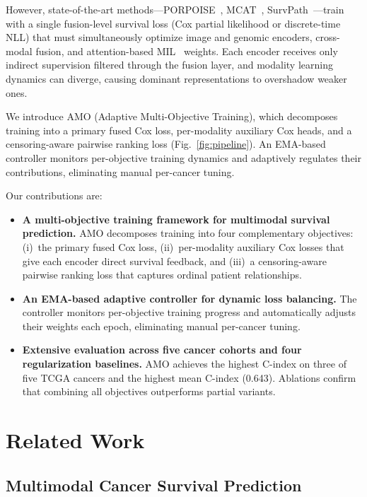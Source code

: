 \documentclass[10pt,twocolumn,letterpaper]{article}
\begin{document}
However, state-of-the-art methods---PORPOISE~\cite{chen2022porpoise},
MCAT~\cite{chen2021}, SurvPath~\cite{jaume2024survpath}---train with
a single fusion-level survival loss (Cox partial likelihood or
discrete-time NLL) that must simultaneously optimize image and
genomic encoders, cross-modal fusion, and attention-based
MIL~\cite{lu2021abmil} weights. Each encoder receives only indirect
supervision filtered through the fusion layer, and modality learning
dynamics can diverge, causing dominant representations to overshadow
weaker ones.

We introduce AMO (Adaptive Multi-Objective Training), which
decomposes training into a primary fused Cox loss, per-modality
auxiliary Cox heads, and a censoring-aware pairwise ranking loss
(Fig.~\ref{fig:pipeline}). An EMA-based controller monitors
per-objective training dynamics and adaptively regulates their
contributions, eliminating manual per-cancer tuning.

Our contributions are:
\begin{itemize}
\item \textbf{A multi-objective training framework for
multimodal survival prediction.} AMO decomposes training into four
complementary objectives: (i)~the primary fused Cox loss,
(ii)~per-modality auxiliary Cox losses that give each encoder
direct survival feedback, and (iii)~a censoring-aware pairwise
ranking loss that captures ordinal patient relationships.

\item \textbf{An EMA-based adaptive controller for dynamic loss
balancing.} The controller monitors per-objective training
progress and automatically adjusts their weights each epoch,
eliminating manual per-cancer tuning.

\item \textbf{Extensive evaluation across five cancer cohorts
and four regularization baselines.} AMO achieves the highest C-index
on three of five TCGA cancers and the highest mean C-index (0.643).
Ablations confirm that combining all objectives outperforms partial variants.
\end{itemize}


\section{Related Work}

\subsection{Multimodal Cancer Survival Prediction}
\end{document}
